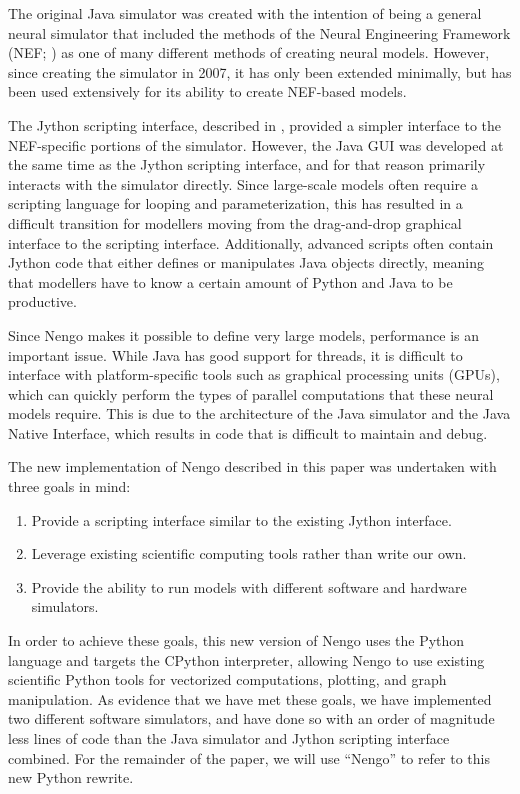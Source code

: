 \documentclass{frontiersSCNS}
\begin{document}
The original Java simulator was created
with the intention of being a general
neural simulator that included
the methods of the Neural Engineering Framework
(NEF; \cite{TODO}) as one of many different
methods of creating neural models.
However, since creating the simulator in 2007,
it has only been extended minimally,
but has been used extensively for its ability
to create NEF-based models.

The Jython scripting interface,
described in \cite{TODO},
provided a simpler interface
to the NEF-specific portions of the simulator.
However, the Java GUI was developed at the same time
as the Jython scripting interface,
and for that reason primarily
interacts with the simulator directly.
Since large-scale models often require
a scripting language for looping
and parameterization,
this has resulted in a difficult transition
for modellers moving from the
drag-and-drop graphical interface
to the scripting interface.
Additionally, advanced scripts often
contain Jython code that either defines
or manipulates Java objects directly,
meaning that modellers have to know
a certain amount of Python and Java to be productive.

Since Nengo makes it possible to define
very large models,
performance is an important issue.
While Java has good support for threads,
it is difficult to interface with
platform-specific tools such as
graphical processing units (GPUs),
which can quickly perform the types of parallel
computations that these neural models require.
This is due to the
architecture of the Java simulator
and the Java Native Interface,
which results in code that
is difficult to maintain and debug.

The new implementation of Nengo described in this paper
was undertaken with three goals in mind:
\begin{enumerate}
  \item Provide a scripting interface
    similar to the existing Jython interface.
  \item Leverage existing scientific computing tools
    rather than write our own.
  \item Provide the ability to run models with
    different software and hardware simulators.
\end{enumerate}

In order to achieve these goals,
this new version of Nengo uses the Python language
and targets the CPython interpreter,
allowing Nengo to use existing scientific Python
tools for vectorized computations, plotting, and graph manipulation.
As evidence that we have met these goals,
we have implemented two different software simulators,
and have done so with an order of magnitude
less lines of code than the Java simulator
and Jython scripting interface combined.
For the remainder of the paper,
we will use ``Nengo'' to refer to
this new Python rewrite.
\end{document}
